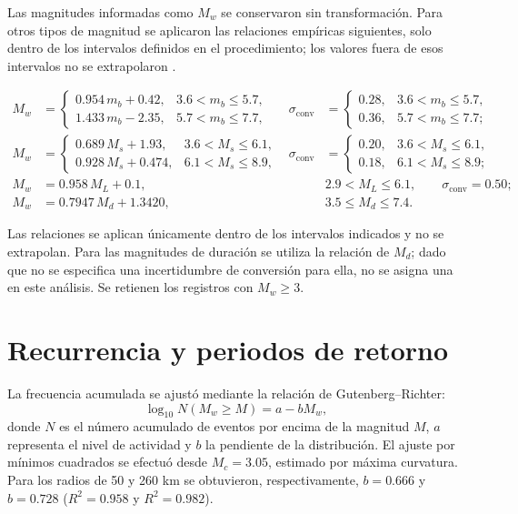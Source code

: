 \documentclass[12pt,oneside]{report}
\begin{document}
Las magnitudes informadas como $M_w$ se conservaron sin transformación.
Para otros tipos de magnitud se aplicaron las relaciones empíricas siguientes,
solo dentro de los intervalos definidos en el procedimiento; los valores fuera
de esos intervalos no se extrapolaron \parencite{bormann2005globally,lolli2014empirical,senel2016new}.

\begin{align*}
M_w &=
\begin{cases}
0.954\,m_b+0.42, & 3.6<m_b\leq5.7,\\
1.433\,m_b-2.35, & 5.7<m_b\leq7.7,
\end{cases}
&
\sigma_{\mathrm{conv}}&=
\begin{cases}
0.28, & 3.6<m_b\leq5.7,\\
0.36, & 5.7<m_b\leq7.7;
\end{cases}\\[4pt]
M_w &=
\begin{cases}
0.689\,M_s+1.93, & 3.6<M_s\leq6.1,\\
0.928\,M_s+0.474, & 6.1<M_s\leq8.9,
\end{cases}
&
\sigma_{\mathrm{conv}}&=
\begin{cases}
0.20, & 3.6<M_s\leq6.1,\\
0.18, & 6.1<M_s\leq8.9;
\end{cases}\\[4pt]
M_w &= 0.958\,M_L+0.1,
&&2.9<M_L\leq6.1,\qquad \sigma_{\mathrm{conv}}=0.50;\\
M_w &= 0.7947\,M_d+1.3420,
&&3.5\leq M_d\leq7.4.
\end{align*}

Las relaciones se aplican únicamente dentro de los intervalos indicados y no
se extrapolan. Para las magnitudes de duración se utiliza la relación de
$M_d$; dado que no se especifica una incertidumbre de conversión para ella, no
se asigna una en este análisis. Se retienen los registros con $M_w\geq3$.

\section{Recurrencia y periodos de retorno}
\label{app:recurrencia}

La frecuencia acumulada se ajustó mediante la relación de Gutenberg--Richter:
\begin{equation}
    \log_{10}N(M_w\geq M)=a-bM_w,
\end{equation}
donde $N$ es el número acumulado de eventos por encima de la magnitud $M$,
$a$ representa el nivel de actividad y $b$ la pendiente de la distribución.
El ajuste por mínimos cuadrados se efectuó desde $M_c=3.05$, estimado por
máxima curvatura. Para los radios de 50 y 260 km se obtuvieron, respectivamente,
$b=0.666$ y $b=0.728$ ($R^2=0.958$ y $R^2=0.982$).
\end{document}
